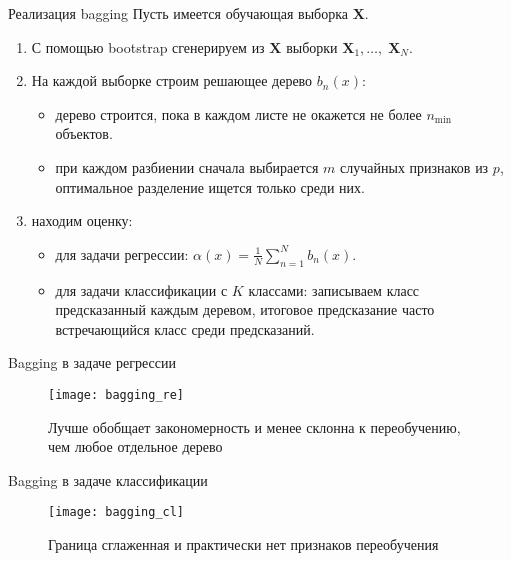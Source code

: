 \documentclass[notheorems, handout]{beamer}
\begin{document}
\begin{frame}{Реализация bagging}
Пусть имеется обучающая выборка $\mathbf{X}$.
\begin{enumerate}
	\item С помощью bootstrap сгенерируем из $\mathbf{X}$ выборки $\mathbf{X}_{1}, \dots,\; \mathbf{X}_{N}$.
	\item На каждой выборке строим решающее дерево $b_{n}(x)$:
		\begin{itemize}
			\item дерево строится, пока в каждом листе не окажется не более $n_{\min}$ объектов.
			\item при каждом разбиении сначала выбирается $m$ случайных признаков из $p$, оптимальное разделение ищется только среди них.
		\end{itemize}
	\item находим оценку:
		\begin{itemize}
			\item для задачи регрессии: $\alpha(x) = \frac{1}{N}\displaystyle\sum_{n = 1}^{N} b_{n}(x)$.
			\item для задачи классификации с $K$ классами: записываем класс предсказанный каждым деревом, итоговое предсказание часто встречающийся класс среди предсказаний.
		\end{itemize}
\end{enumerate}
\end{frame}

\begin{frame}{Bagging в задаче регрессии}
\begin{figure}[h!]
  \texttt{[image: bagging\_re]}
 \caption{Лучше обобщает закономерность и менее склонна к переобучению, чем любое отдельное дерево}
\end{figure}
\end{frame}

\begin{frame}{Bagging в задаче классификации}
\begin{figure}[h!]
  \texttt{[image: bagging\_cl]}
 \caption{Граница сглаженная и практически нет признаков переобучения}
\end{figure}
\end{frame}
\end{document}
